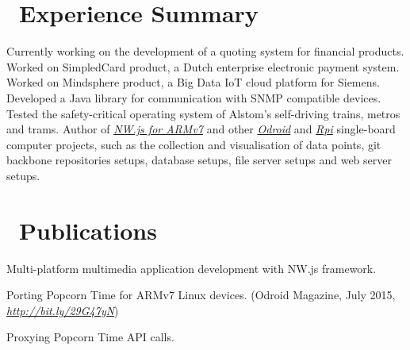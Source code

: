 \documentclass[hidelinks,11pt]{friggeri-cv}
\def\book{{\FA\faBook}}
\def\suitcase{{\FA\faSuitcase}}
\begin{document}
\section{{\suitcase}\ Experience Summary}
\begin{entrylist}
    {Currently working on the development of a quoting system for financial products.}
    {Worked on SimpledCard product, a Dutch enterprise electronic payment system.}
    {Worked on Mindsphere product, a Big Data IoT cloud platform for Siemens.}
    {Developed a Java library for communication with SNMP compatible devices.}
    {Tested the safety-critical operating system of Alstom's self-driving trains, metros and trams.}
    {Author of \textit{\href{https://github.com/LeonardLaszlo/nw.js-armv7-binaries}{NW.js for ARMv7}} and other \textit{\href{http://www.hardkernel.com/main/main.php}{Odroid}} and \textit{\href{https://www.raspberrypi.org}{Rpi}} single-board computer projects, such as the collection and visualisation of data points, git backbone repositories setups, database setups, file server setups and web server setups.}
\end{entrylist}

\section{{\book}\ Publications}
Multi-platform multimedia application development with NW.js framework.

Porting Popcorn Time for ARMv7 Linux devices.
{\small (Odroid Magazine, July 2015, \textit{\href{http://bit.ly/29G47yN}{http://bit.ly/29G47yN}})}

Proxying Popcorn Time API calls.

\newpage
\end{document}
